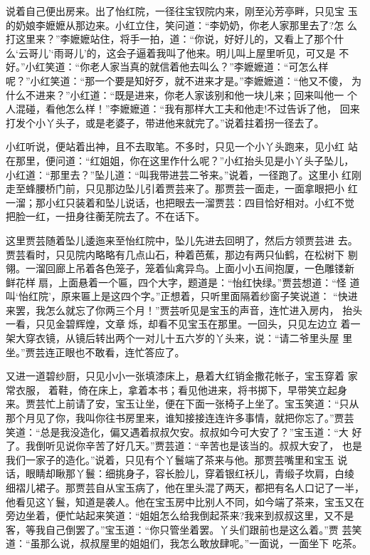 说着自己便出房来。出了怡红院，一径往宝钗院内来，刚至沁芳亭畔，只见宝
玉的奶娘李嬷嬷从那边来。小红立住，笑问道：“李奶奶，你老人家那里去了?怎
么打这里来？”李嬷嬷站住，将手一拍，道：“你说，好好儿的，又看上了那个什
么‘云哥儿’‘雨哥儿’的，这会子逼着我叫了他来。明儿叫上屋里听见，可又是
不好。”小红笑道：“你老人家当真的就信着他去叫么？”李嬷嬷道：“可怎么样
呢？”小红笑道：“那一个要是知好歹，就不进来才是。”李嬷嬷道：“他又不傻，
为什么不进来？”小红道：“既是进来，你老人家该别和他一块儿来；回来叫他一
个人混碰，看他怎么样！”李嬷嬷道：“我有那样大工夫和他走!不过告诉了他，
回来打发个小丫头子，或是老婆子，带进他来就完了。”说着拄着拐一径去了。

小红听说，便站着出神，且不去取笔。不多时，只见一个小丫头跑来，见小红
站在那里，便问道：“红姐姐，你在这里作什么呢？”小红抬头见是小丫头子坠儿，
小红道：“那里去？”坠儿道：“叫我带进芸二爷来。”说着，一径跑了。这里小
红刚走至蜂腰桥门前，只见那边坠儿引着贾芸来了。那贾芸一面走，一面拿眼把小
红一溜；那小红只装着和坠儿说话，也把眼去一溜贾芸：四目恰好相对。小红不觉
把脸一红，一扭身往蘅芜院去了。不在话下。

这里贾芸随着坠儿逶迤来至怡红院中，坠儿先进去回明了，然后方领贾芸进
去。贾芸看时，只见院内略略有几点山石，种着芭蕉，那边有两只仙鹤，在松树下
剔翎。一溜回廊上吊着各色笼子，笼着仙禽异鸟。上面小小五间抱厦，一色雕镂新
鲜花样扇，上面悬着一个匾，四个大字，题道是：“怡红快绿。”贾芸想道：“怪
道叫‘怡红院’，原来匾上是这四个字。”正想着，只听里面隔着纱窗子笑说道：
“快进来罢，我怎么就忘了你两三个月！”贾芸听见是宝玉的声音，连忙进入房内，
抬头一看，只见金碧辉煌，文章烁，却看不见宝玉在那里。一回头，只见左边立
着一架大穿衣镜，从镜后转出两个一对儿十五六岁的丫头来，说：“请二爷里头屋
里坐。”贾芸连正眼也不敢看，连忙答应了。

又进一道碧纱厨，只见小小一张填漆床上，悬着大红销金撒花帐子，宝玉穿着
家常衣服，着鞋，倚在床上，拿着本书；看见他进来，将书掷下，早带笑立起身
来。贾芸忙上前请了安，宝玉让坐，便在下面一张椅子上坐了。宝玉笑道：“只从
那个月见了你，我叫你往书房里来，谁知接接连连许多事情，就把你忘了。”贾芸
笑道：“总是我没造化，偏又遇着叔叔欠安。叔叔如今可大安了？”宝玉道：“大
好了。我倒听见说你辛苦了好几天。”贾芸道：“辛苦也是该当的。叔叔大安了，
也是我们一家子的造化。”说着，只见有个丫鬟端了茶来与他。那贾芸嘴里和宝玉
说话，眼睛却瞅那丫鬟：细挑身子，容长脸儿，穿着银红袄儿，青缎子坎肩，白绫
细褶儿裙子。那贾芸自从宝玉病了，他在里头混了两天，都把有名人口记了一半，
他看见这丫鬟，知道是袭人。他在宝玉房中比别人不同，如今端了茶来，宝玉又在
旁边坐着，便忙站起来笑道：“姐姐怎么给我倒起茶来?我来到叔叔这里，又不是
客，等我自己倒罢了。”宝玉道：“你只管坐着罢。丫头们跟前也是这么着。”贾
芸笑道：“虽那么说，叔叔屋里的姐姐们，我怎么敢放肆呢。”一面说，一面坐下
吃茶。

